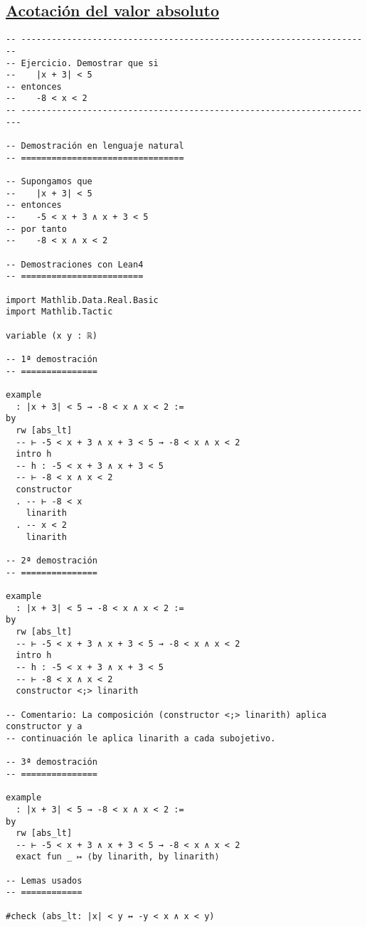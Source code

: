 \subsection{\href{./src/Logica/Acotacion\_del\_valor\_absoluto.lean}{Acotación del valor absoluto}}
\label{sec:org90c9b29}
\begin{verbatim}
-- ---------------------------------------------------------------------
-- Ejercicio. Demostrar que si
--    |x + 3| < 5
-- entonces
--    -8 < x < 2
-- ----------------------------------------------------------------------

-- Demostración en lenguaje natural
-- ================================

-- Supongamos que
--    |x + 3| < 5
-- entonces
--    -5 < x + 3 ∧ x + 3 < 5
-- por tanto
--    -8 < x ∧ x < 2

-- Demostraciones con Lean4
-- ========================

import Mathlib.Data.Real.Basic
import Mathlib.Tactic

variable (x y : ℝ)

-- 1ª demostración
-- ===============

example
  : |x + 3| < 5 → -8 < x ∧ x < 2 :=
by
  rw [abs_lt]
  -- ⊢ -5 < x + 3 ∧ x + 3 < 5 → -8 < x ∧ x < 2
  intro h
  -- h : -5 < x + 3 ∧ x + 3 < 5
  -- ⊢ -8 < x ∧ x < 2
  constructor
  . -- ⊢ -8 < x
    linarith
  . -- x < 2
    linarith

-- 2ª demostración
-- ===============

example
  : |x + 3| < 5 → -8 < x ∧ x < 2 :=
by
  rw [abs_lt]
  -- ⊢ -5 < x + 3 ∧ x + 3 < 5 → -8 < x ∧ x < 2
  intro h
  -- h : -5 < x + 3 ∧ x + 3 < 5
  -- ⊢ -8 < x ∧ x < 2
  constructor <;> linarith

-- Comentario: La composición (constructor <;> linarith) aplica constructor y a
-- continuación le aplica linarith a cada subojetivo.

-- 3ª demostración
-- ===============

example
  : |x + 3| < 5 → -8 < x ∧ x < 2 :=
by
  rw [abs_lt]
  -- ⊢ -5 < x + 3 ∧ x + 3 < 5 → -8 < x ∧ x < 2
  exact fun _ ↦ ⟨by linarith, by linarith⟩

-- Lemas usados
-- ============

#check (abs_lt: |x| < y ↔ -y < x ∧ x < y)
\end{verbatim}

